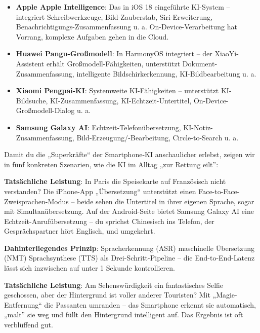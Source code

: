 
\begin{itemize}
  \item \textbf{Apple Apple Intelligence}: Das in iOS 18 eingeführte KI-System – integriert Schreibwerkzeuge, Bild-Zauberstab, Siri-Erweiterung, Benachrichtigungs-Zusammenfassung u. a. On-Device-Verarbeitung hat Vorrang, komplexe Aufgaben gehen in die Cloud.
  \item \textbf{Huawei Pangu-Großmodell}: In HarmonyOS integriert – der XiaoYi-Assistent erhält Großmodell-Fähigkeiten, unterstützt Dokument-Zusammenfassung, intelligente Bildschirkerkennung, KI-Bildbearbeitung u. a.
  \item \textbf{Xiaomi Pengpai-KI}: Systemweite KI-Fähigkeiten – unterstützt KI-Bildsuche, KI-Zusammenfassung, KI-Echtzeit-Untertitel, On-Device-Großmodell-Dialog u. a.
  \item \textbf{Samsung Galaxy AI}: Echtzeit-Telefonübersetzung, KI-Notiz-Zusammenfassung, Bild-Erzeugung/-Bearbeitung, Circle-to-Search u. a.
\end{itemize}


Damit du die „Superkräfte“ der Smartphone-KI anschaulicher erlebst, zeigen wir in fünf konkreten Szenarien, wie die KI im Alltag „zur Rettung eilt”:


\textbf{Tatsächliche Leistung}: In Paris die Speisekarte auf Französisch nicht verstanden? Die iPhone-App „Übersetzung“ unterstützt einen Face-to-Face-Zweisprachen-Modus – beide sehen die Untertitel in ihrer eigenen Sprache, sogar mit Simultanübersetzung. Auf der Android-Seite bietet Samsung Galaxy AI eine Echtzeit-Anrufübersetzung – du sprichst Chinesisch ins Telefon, der Gesprächspartner hört Englisch, und umgekehrt.

\textbf{Dahinterliegendes Prinzip}: Spracherkennung (ASR) maschinelle Übersetzung (NMT) Sprachsynthese (TTS) als Drei-Schritt-Pipeline – die End-to-End-Latenz lässt sich inzwischen auf unter 1 Sekunde kontrollieren.


\textbf{Tatsächliche Leistung}: Am Sehenswürdigkeit ein fantastisches Selfie geschossen, aber der Hintergrund ist voller anderer Touristen? Mit „Magie-Entfernung“ die Passanten umranden – das Smartphone erkennt sie automatisch, „malt” sie weg und füllt den Hintergrund intelligent auf. Das Ergebnis ist oft verblüffend gut.

